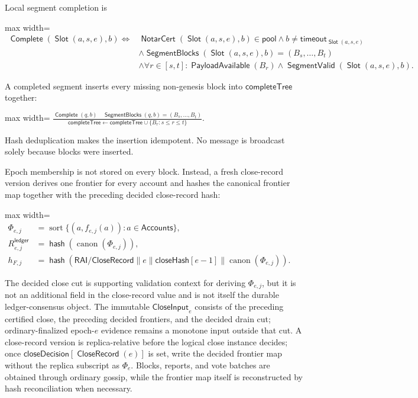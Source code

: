 \documentclass[sigplan,twocolumn,review,anonymous]{acmart}
\newcommand{\func}[1]{\operatorname{\mathsf{#1}}}
\newcommand{\hash}{\func{hash}}
\newcommand{\NotarCert}{\func{NotarCert}}
\newcommand{\Slot}{\func{Slot}}
\newcommand{\SegmentBlocks}{\func{SegmentBlocks}}
\newcommand{\SegmentValid}{\func{SegmentValid}}
\newcommand{\CloseRecord}{\func{CloseRecord}}
\newcommand{\closeDecision}{\mathsf{closeDecision}}
\newcommand{\Complete}{\func{Complete}}
\newcommand{\timeoutVal}{\mathsf{timeout}}
\newcommand{\completeTree}{\mathsf{completeTree}}
\newcommand{\closeHash}{\mathsf{closeHash}}
\newcommand{\PayloadAvailable}{\func{PayloadAvailable}}
\begin{document}
Local segment completion is
\begin{center}
\begin{adjustbox}{max width=\columnwidth}
\(\displaystyle
\begin{aligned}
\Complete(\Slot(a,s,e),b)
\iff{}& \NotarCert(\Slot(a,s,e),b)\in\mathsf{pool}
\wedge b\neq\timeoutVal_{\Slot(a,s,e)}\\
&\wedge\SegmentBlocks(\Slot(a,s,e),b)=(B_s,\ldots,B_t)\\
&\wedge\forall r\in[s,t]:\PayloadAvailable(B_r)
\wedge\SegmentValid(\Slot(a,s,e),b).
\end{aligned}
\)
\end{adjustbox}
\end{center}
A completed segment inserts every missing non-genesis block into \(\completeTree\) together:
\begin{center}
\begin{adjustbox}{max width=\columnwidth}
\(\displaystyle
\frac{\Complete(q,b)\quad\SegmentBlocks(q,b)=(B_s,\ldots,B_t)}
{\completeTree\gets\completeTree\cup\{B_r:s\le r\le t\}}.
\)
\end{adjustbox}
\end{center}
Hash deduplication makes the insertion idempotent.  No message is broadcast solely because blocks were
inserted.

Epoch membership is not stored on every block.  Instead, a fresh close-record version derives one
frontier for every account and hashes the canonical frontier map together with the preceding decided
close-record hash:
\begin{center}
\begin{adjustbox}{max width=\columnwidth}
\(\displaystyle
\begin{aligned}
\Phi_{e,j}
    &=\operatorname{sort}\{(a,f_{e,j}(a)):a\in\mathsf{Accounts}\},\\
R^{\mathsf{ledger}}_{e,j}
    &=\hash(\operatorname{canon}(\Phi_{e,j})),\\
h_{F,j}
    &=\hash(\mathsf{RAI/CloseRecord}\parallel e\parallel\closeHash[e-1]
       \parallel\operatorname{canon}(\Phi_{e,j})).
\end{aligned}
\)
\end{adjustbox}
\end{center}
The decided close cut is supporting validation context for deriving \(\Phi_{e,j}\), but it is not an
additional field in the close-record value and is not itself the durable ledger-consensus object.  The
immutable \(\mathsf{CloseInput}_e\) consists of the preceding certified close, the preceding decided
frontiers, and the decided drain cut; ordinary-finalized epoch-\(e\) evidence remains a monotone input
outside that cut.  A close-record version is replica-relative before the logical close instance decides;
once \(\closeDecision[\CloseRecord(e)]\) is set, write the decided frontier map without the replica
subscript as \(\Phi_e\).  Blocks, reports, and vote batches are obtained through ordinary gossip, while
the frontier map itself is reconstructed by hash reconciliation when necessary.
\end{document}
